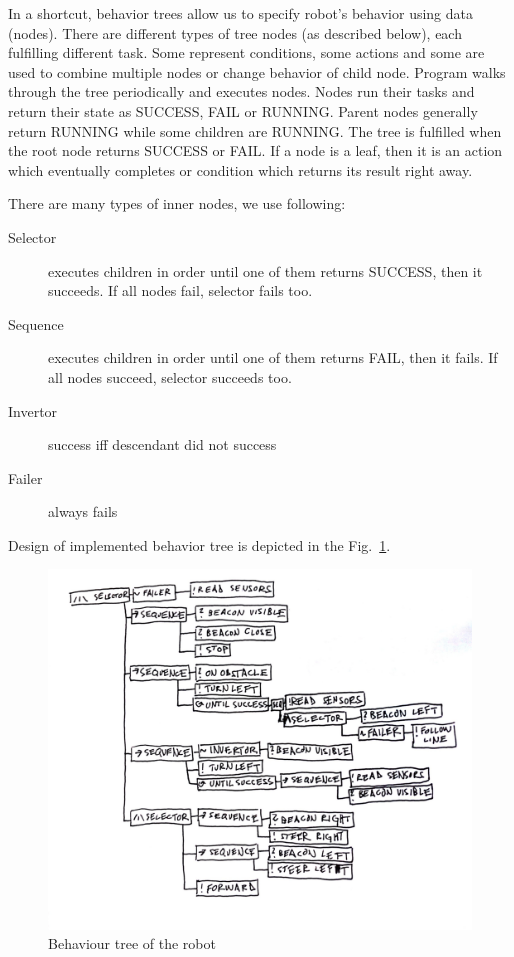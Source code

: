 \documentclass[a4paper]{article}
\begin{document}
In a shortcut, behavior trees allow us to specify robot's behavior using data (nodes). There are different types of tree nodes (as described below), each fulfilling different task. Some represent conditions, some actions and some are used to combine multiple nodes or change behavior of child node. Program walks through the tree periodically and executes nodes. Nodes run their tasks and return their state as SUCCESS, FAIL or RUNNING. Parent nodes generally return RUNNING while some children are RUNNING. The tree is fulfilled when the root node returns SUCCESS or FAIL. If a node is a leaf, then it is an action which eventually completes or condition which returns its result right away.

\bigskip
\noindent
There are many types of inner nodes, we use following:
\begin{description}
\item[Selector] executes children in order until one of them returns SUCCESS, then it succeeds. If all nodes fail, selector fails too.
\item[Sequence] executes children in order until one of them returns FAIL, then it fails. If all nodes succeed, selector succeeds too.
\item[Invertor] success iff descendant did not success
\item[Failer] always fails
\end{description}

\noindent
Design of implemented behavior tree is depicted in the Fig.~\ref{fig:behaviour_tree}.  

\begin{figure}[h]
\centering
\includegraphics[width=\textwidth]{tree.jpg}
\caption{\label{fig:behaviour_tree}Behaviour tree of the robot}
\end{figure}
\end{document}
